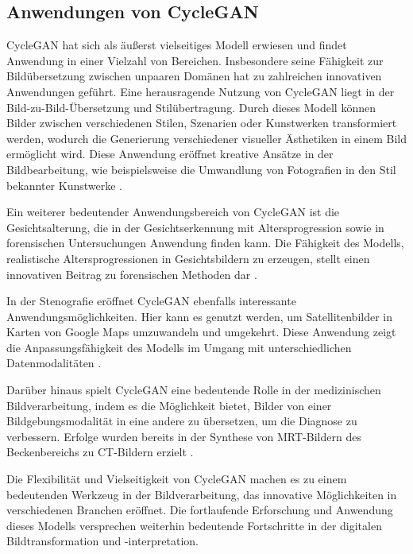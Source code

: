 \subsection{Anwendungen von CycleGAN}
CycleGAN hat sich als äußerst vielseitiges Modell erwiesen und findet Anwendung in einer Vielzahl von Bereichen. Insbesondere seine Fähigkeit zur Bildübersetzung zwischen unpaaren Domänen hat zu zahlreichen innovativen Anwendungen geführt. Eine herausragende Nutzung von CycleGAN liegt in der Bild-zu-Bild-Übersetzung und Stilübertragung. Durch dieses Modell können Bilder zwischen verschiedenen Stilen, Szenarien oder Kunstwerken transformiert werden, wodurch die Generierung verschiedener visueller Ästhetiken in einem Bild ermöglicht wird. Diese Anwendung eröffnet kreative Ansätze in der Bildbearbeitung, wie beispielsweise die Umwandlung von Fotografien in den Stil bekannter Kunstwerke \cite{Zhu.2017}.

Ein weiterer bedeutender Anwendungsbereich von CycleGAN ist die Gesichtsalterung, die in der Gesichtserkennung mit Altersprogression sowie in forensischen Untersuchungen Anwendung finden kann. Die Fähigkeit des Modells, realistische Altersprogressionen in Gesichtsbildern zu erzeugen, stellt einen innovativen Beitrag zu forensischen Methoden dar \cite{Sharma.2022}.

In der Stenografie eröffnet CycleGAN ebenfalls interessante Anwendungsmöglichkeiten. Hier kann es genutzt werden, um Satellitenbilder in Karten von Google Maps umzuwandeln und umgekehrt. Diese Anwendung zeigt die Anpassungsfähigkeit des Modells im Umgang mit unterschiedlichen Datenmodalitäten \cite{Chu.2017}.

Darüber hinaus spielt CycleGAN eine bedeutende Rolle in der medizinischen Bildverarbeitung, indem es die Möglichkeit bietet, Bilder von einer Bildgebungsmodalität in eine andere zu übersetzen, um die Diagnose zu verbessern. Erfolge wurden bereits in der Synthese von MRT-Bildern des Beckenbereichs zu CT-Bildern erzielt \cite{Liu.2021}.

Die Flexibilität und Vielseitigkeit von CycleGAN machen es zu einem bedeutenden Werkzeug in der Bildverarbeitung, das innovative Möglichkeiten in verschiedenen Branchen eröffnet. Die fortlaufende Erforschung und Anwendung dieses Modells versprechen weiterhin bedeutende Fortschritte in der digitalen Bildtransformation und -interpretation.